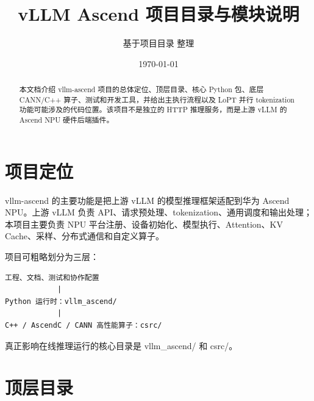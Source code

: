 \documentclass[UTF8,11pt,a4paper]{ctexart}
\title{\bfseries vLLM Ascend 项目目录与模块说明}
\author{基于项目目录 \folder{C:/Users/Administrator/Desktop/找工作/vllm-ascend} 整理}
\date{\today}
\DeclareRobustCommand{\folder}[1]{\texttt{\detokenize{#1}}}
\def\folder#1{#1}%
\begin{document}
\maketitle

\begin{abstract}
本文档介绍 \folder{vllm-ascend} 项目的总体定位、顶层目录、核心 Python 包、底层 CANN/C++ 算子、测试和开发工具，并给出主执行流程以及 LoPT 并行 tokenization 功能可能涉及的代码位置。该项目不是独立的 HTTP 推理服务，而是上游 vLLM 的 Ascend NPU 硬件后端插件。
\end{abstract}

\tableofcontents
\newpage

\section{项目定位}

\folder{vllm-ascend} 的主要功能是把上游 vLLM 的模型推理框架适配到华为 Ascend NPU。上游 vLLM 负责 API、请求预处理、tokenization、通用调度和输出处理；本项目主要负责 NPU 平台注册、设备初始化、模型执行、Attention、KV Cache、采样、分布式通信和自定义算子。

项目可粗略划分为三层：

\begin{lstlisting}
工程、文档、测试和协作配置
            |
Python 运行时：vllm_ascend/
            |
C++ / AscendC / CANN 高性能算子：csrc/
\end{lstlisting}

真正影响在线推理运行的核心目录是 \folder{vllm_ascend/} 和 \folder{csrc/}。

\section{顶层目录}
\end{document}
